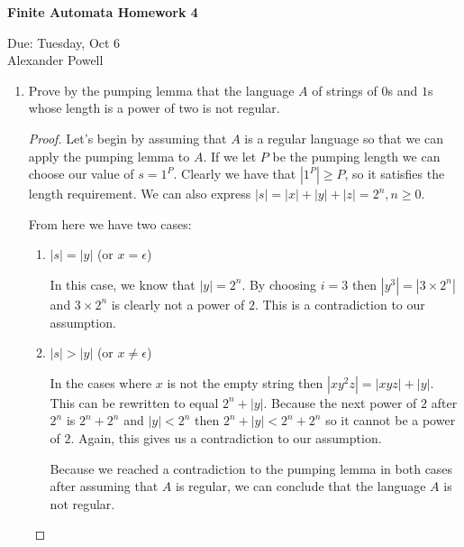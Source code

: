 \documentclass[11pt]{article}
\begin{document}
\begin{center}             %
\begin{LARGE}
{\bf Finite Automata Homework 4}
\end{LARGE}
\vskip 0.25cm      %

Due: Tuesday, Oct 6\\  %
Alexander Powell
\end{center}

\begin{enumerate}

\item
Prove by the pumping lemma that the language $A$ of strings of $0$s and $1$s whose length is a power of two is not regular.

\begin{proof}

Let's begin by assuming that $A$ is a regular language so that we can apply the pumping lemma to $A$.  If we let $P$ be the pumping length we can choose our value of $s = 1^P$.  Clearly we have that $|1^P| \geq P$, so it satisfies the length requirement.  We can also express $|s| = |x| + |y| + |z| = 2^n, n \geq 0$.  

From here we have two cases:
\begin{enumerate}

\item
$|s|=|y|$ (or $x = \epsilon$)

In this case, we know that $|y| = 2^n$.  By choosing $i = 3$ then $|y^3| = |3 \times 2^n|$ and $3 \times 2^n$ is clearly not a power of $2$.  This is a contradiction to our assumption.  

\item
$|s|>|y|$ (or $x \neq \epsilon$)

In the cases where $x$ is not the empty string then $|xy^2z| = |xyz| + |y|$.  This can be rewritten to equal $2^n + |y|$.  Because the next power of $2$ after $2^n$ is $2^n + 2^n$ and $|y| < 2^n$ then $2^n + |y| < 2^n + 2^n$ so it cannot be a power of $2$.  Again, this gives us a contradiction to our assumption.  

Because we reached a contradiction to the pumping lemma in both cases after assuming that $A$ is regular, we can conclude that the language $A$ is not regular.  

\end{enumerate}

\end{proof}


\end{enumerate}
\end{document}
